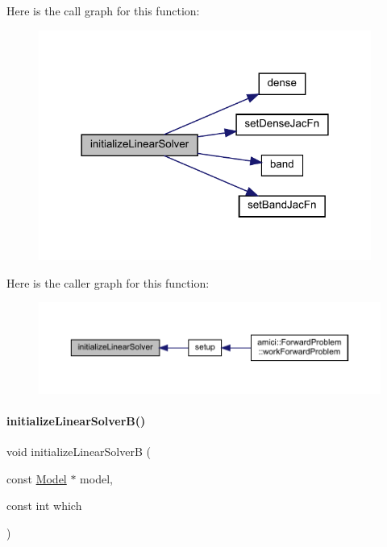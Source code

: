 Here is the call graph for this function\+:
\nopagebreak
\begin{figure}[H]
\begin{center}
\leavevmode
\includegraphics[width=309pt]{classamici_1_1_solver_a6f41389f3a02d0b1ed9bfebcc080d3e1_cgraph}
\end{center}
\end{figure}
Here is the caller graph for this function\+:
\nopagebreak
\begin{figure}[H]
\begin{center}
\leavevmode
\includegraphics[width=350pt]{classamici_1_1_solver_a6f41389f3a02d0b1ed9bfebcc080d3e1_icgraph}
\end{center}
\end{figure}
\mbox{\label{classamici_1_1_solver_a4f596731d15be6e9e76a2147aa1cce34}} 
\paragraph{\texorpdfstring{initialize\+Linear\+Solver\+B()}{initializeLinearSolverB()}}
{\footnotesize\ttfamily void initialize\+Linear\+SolverB (\begin{DoxyParamCaption}\item[{const \mbox{\hyperlink{classamici_1_1_model}{Model}} $\ast$}]{model,  }\item[{const int}]{which }\end{DoxyParamCaption})\hspace{0.3cm}{\ttfamily [protected]}}

